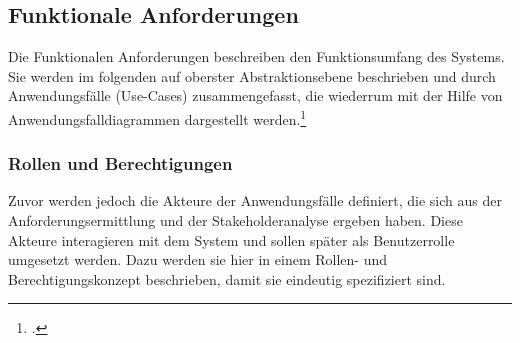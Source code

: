 \subsection{Funktionale Anforderungen}
Die Funktionalen Anforderungen beschreiben den Funktionsumfang des Systems. Sie werden im folgenden auf oberster Abstraktionsebene beschrieben und durch Anwendungsfälle (Use-Cases) zusammengefasst, die wiederrum mit der Hilfe von Anwendungsfalldiagrammen dargestellt werden.\footcite[Vgl.][S. 496]{balzert}

\subsubsection{Rollen und Berechtigungen}
\label{kap:RuB}
Zuvor werden jedoch die Akteure der Anwendungsfälle definiert, die sich aus der Anforderungsermittlung und der Stakeholderanalyse ergeben haben. Diese Akteure interagieren mit dem System und sollen später als Benutzerrolle umgesetzt werden. Dazu werden sie hier in einem Rollen- und Berechtigungskonzept beschrieben, damit sie eindeutig spezifiziert sind.

